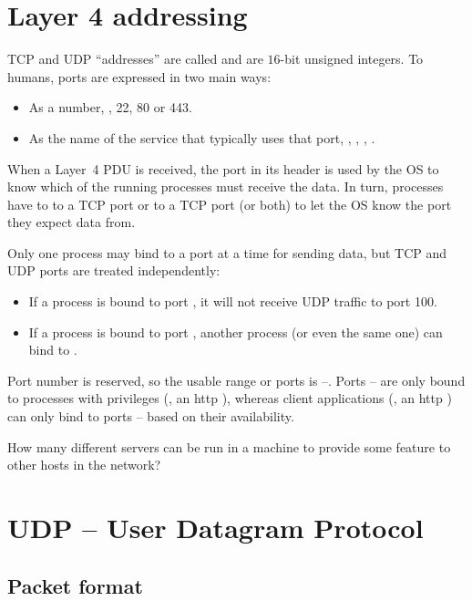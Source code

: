 \section{Layer 4 addressing}

TCP and UDP ``addresses'' are called  and are $16$-bit unsigned integers.
To humans, ports are expressed in two main ways:
\begin{itemize}
\item As a number, \eg, 22, 80 or 443.
\item As the name of the service that typically uses that port, \eg, , , .
\end{itemize}

When a Layer~4 PDU is received, the port in its header is used by the OS to know which of the running 
processes must receive the data. 
In turn, processes have to  to a TCP port or to a TCP port (or both)
to let the OS know the port they expect data from.

Only one process may bind to a port at a time for sending data, but TCP and UDP ports
are treated independently:
\begin{itemize}
 \item If a process is bound to port , it will not receive UDP traffic to port 100.
 \item If a process is bound to port , another process (or even the same one) can 
   bind to .  
\end{itemize}

Port number  is reserved, so the usable range or ports is --. 
Ports -- are only bound to 
processes with privileges (\eg, an http ), whereas client applications (\eg, an http ) 
can only bind to ports -- based on their availability.

\begin{exercise}
How many different servers can be run in a machine to provide some feature to other hosts in the network?
\end{exercise}


\section{UDP -- User Datagram Protocol}
\subsection{Packet format}

